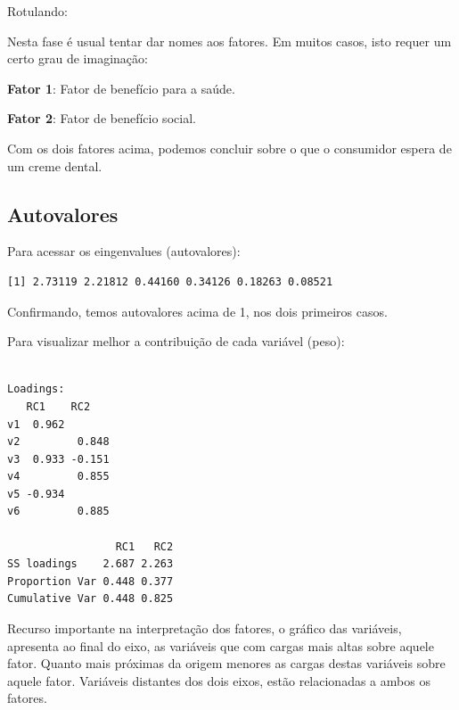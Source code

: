\documentclass[12pt,brazil,oneside]{book}
\newenvironment{Shaded}{\begin{snugshade}}{\end{snugshade}}
\newcommand{\NormalTok}[1]{#1}
\newcommand{\OperatorTok}[1]{\textcolor[rgb]{0.81,0.36,0.00}{\textbf{#1}}}
\begin{document}
Rotulando:

Nesta fase é usual tentar dar nomes aos fatores. Em muitos casos, isto requer um certo grau de imaginação:

\textbf{Fator 1}: Fator de benefício para a saúde.

\textbf{Fator 2}: Fator de benefício social.

Com os dois fatores acima, podemos concluir sobre o que o consumidor espera de um creme dental.

\hypertarget{autovalores-1}{%
\subsection{Autovalores}\label{autovalores-1}}

Para acessar os eingenvalues (autovalores):

\begin{Shaded}
\end{Shaded}

\begin{verbatim}
[1] 2.73119 2.21812 0.44160 0.34126 0.18263 0.08521
\end{verbatim}

Confirmando, temos autovalores acima de 1, nos dois primeiros casos.

Para visualizar melhor a contribuição de cada variável (peso):

\begin{Shaded}
\end{Shaded}

\begin{verbatim}

Loadings:
   RC1    RC2   
v1  0.962       
v2         0.848
v3  0.933 -0.151
v4         0.855
v5 -0.934       
v6         0.885

                 RC1   RC2
SS loadings    2.687 2.263
Proportion Var 0.448 0.377
Cumulative Var 0.448 0.825
\end{verbatim}

Recurso importante na interpretação dos fatores, o gráfico das variáveis, apresenta ao final do eixo, as variáveis que com cargas mais altas sobre aquele fator. Quanto mais próximas da origem menores as cargas destas variáveis sobre aquele fator. Variáveis distantes dos dois eixos, estão relacionadas a ambos
os fatores.
\end{document}
